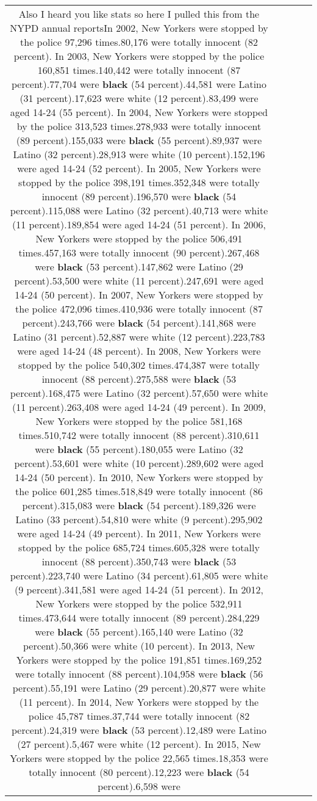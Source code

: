 \documentclass[11pt]{article}
\newlength\mylength
\begin{document}
\begin{center}
\begin{longtable}{|C{.65\mylength}|C{.30\mylength}|C{.12\mylength}|C{.12\mylength}|C{.12\mylength}|}
  \small Also I heard you like stats so here I pulled this from the NYPD annual reportsIn 2002, New Yorkers were stopped by the police 97,296 times.80,176 were totally innocent (82 percent). In 2003, New Yorkers were stopped by the police 160,851 times.140,442 were totally innocent (87 percent).77,704 were \textbf{black} (54 percent).44,581 were Latino (31 percent).17,623 were white (12 percent).83,499 were aged 14-24 (55 percent). In 2004, New Yorkers were stopped by the police 313,523 times.278,933 were totally innocent (89 percent).155,033 were \textbf{black} (55 percent).89,937 were Latino (32 percent).28,913 were white (10 percent).152,196 were aged 14-24 (52 percent). In 2005, New Yorkers were stopped by the police 398,191 times.352,348 were totally innocent (89 percent).196,570 were \textbf{black} (54 percent).115,088 were Latino (32 percent).40,713 were white (11 percent).189,854 were aged 14-24 (51 percent). In 2006, New Yorkers were stopped by the police 506,491 times.457,163 were totally innocent (90 percent).267,468 were \textbf{black} (53 percent).147,862 were Latino (29 percent).53,500 were white (11 percent).247,691 were aged 14-24 (50 percent). In 2007, New Yorkers were stopped by the police 472,096 times.410,936 were totally innocent (87 percent).243,766 were \textbf{black} (54 percent).141,868 were Latino (31 percent).52,887 were white (12 percent).223,783 were aged 14-24 (48 percent). In 2008, New Yorkers were stopped by the police 540,302 times.474,387 were totally innocent (88 percent).275,588 were \textbf{black} (53 percent).168,475 were Latino (32 percent).57,650 were white (11 percent).263,408 were aged 14-24 (49 percent). In 2009, New Yorkers were stopped by the police 581,168 times.510,742 were totally innocent (88 percent).310,611 were \textbf{black} (55 percent).180,055 were Latino (32 percent).53,601 were white (10 percent).289,602 were aged 14-24 (50 percent). In 2010, New Yorkers were stopped by the police 601,285 times.518,849 were totally innocent (86 percent).315,083 were \textbf{black} (54 percent).189,326 were Latino (33 percent).54,810 were white (9 percent).295,902 were aged 14-24 (49 percent). In 2011, New Yorkers were stopped by the police 685,724 times.605,328 were totally innocent (88 percent).350,743 were \textbf{black} (53 percent).223,740 were Latino (34 percent).61,805 were white (9 percent).341,581 were aged 14-24 (51 percent). In 2012, New Yorkers were stopped by the police 532,911 times.473,644 were totally innocent (89 percent).284,229 were \textbf{black} (55 percent).165,140 were Latino (32 percent).50,366 were white (10 percent). In 2013, New Yorkers were stopped by the police 191,851 times.169,252 were totally innocent (88 percent).104,958 were \textbf{black} (56 percent).55,191 were Latino (29 percent).20,877 were white (11 percent). In 2014, New Yorkers were stopped by the police 45,787 times.37,744 were totally innocent (82 percent).24,319 were \textbf{black} (53 percent).12,489 were Latino (27 percent).5,467 were white (12 percent). In 2015, New Yorkers were stopped by the police 22,565 times.18,353 were totally innocent (80 percent).12,223 were \textbf{black} (54 percent).6,598 were 
\end{longtable}
\end{center}
\end{document}
